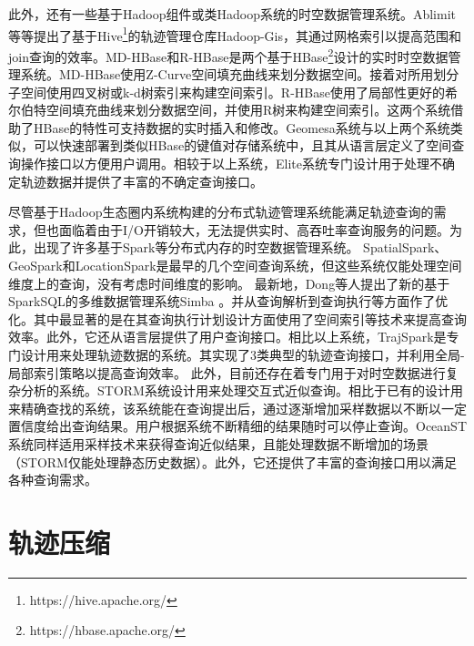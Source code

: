 此外，还有一些基于Hadoop组件或类Hadoop系统的时空数据管理系统。Ablimit等等提出了基于Hive\footnote{https://hive.apache.org/}的轨迹管理仓库Hadoop-Gis\cite{AjiWVLL0S13}，其通过网格索引以提高范围和join查询的效率。MD-HBase\cite{MDHBase}和R-HBase\cite{RHBase}是两个基于HBase\footnote{https://hbase.apache.org/}设计的实时时空数据管理系统。MD-HBase使用Z-Curve空间填充曲线来划分数据空间。接着对所用划分子空间使用四叉树或k-d树索引来构建空间索引。R-HBase使用了局部性更好的希尔伯特空间填充曲线来划分数据空间，并使用R树来构建空间索引。这两个系统借助了HBase的特性可支持数据的实时插入和修改。Geomesa系统\cite{Geomesa}与以上两个系统类似，可以快速部署到类似HBase的键值对存储系统中，且其从语言层定义了空间查询操作接口以方便用户调用。相较于以上系统，Elite系统\cite{XieMCDJ16}专门设计用于处理不确定轨迹数据并提供了丰富的不确定查询接口。

尽管基于Hadoop生态圈内系统构建的分布式轨迹管理系统能满足轨迹查询的需求，但也面临着由于I/O开销较大，无法提供实时、高吞吐率查询服务的问题。为此，出现了许多基于Spark等分布式内存的时空数据管理系统。
SpatialSpark\cite{SpatialSpark}、GeoSpark\cite{GeoSpark}和LocationSpark\cite{Locationspark}是最早的几个空间查询系统，但这些系统仅能处理空间维度上的查询，没有考虑时间维度的影响。
最新地，Dong等人提出了新的基于SparkSQL的多维数据管理系统Simba \cite{Simba}。并从查询解析到查询执行等方面作了优化。其中最显著的是在其查询执行计划设计方面使用了空间索引等技术来提高查询效率。此外，它还从语言层提供了用户查询接口。相比以上系统，TrajSpark\cite{TrajSpark}是专门设计用来处理轨迹数据的系统。其实现了3类典型的轨迹查询接口，并利用全局-局部索引策略以提高查询效率。
此外，目前还存在着专门用于对时空数据进行复杂分析的系统\cite{OceanST,STORM}。STORM\cite{STORM}系统设计用来处理交互式近似查询。相比于已有的设计用来精确查找的系统，该系统能在查询提出后，通过逐渐增加采样数据以不断以一定置信度给出查询结果。用户根据系统不断精细的结果随时可以停止查询。OceanST\cite{OceanST}系统同样适用采样技术来获得查询近似结果，且能处理数据不断增加的场景（STORM仅能处理静态历史数据）。此外，它还提供了丰富的查询接口用以满足各种查询需求。


\section{轨迹压缩}\label{sec-c2-reduction}

